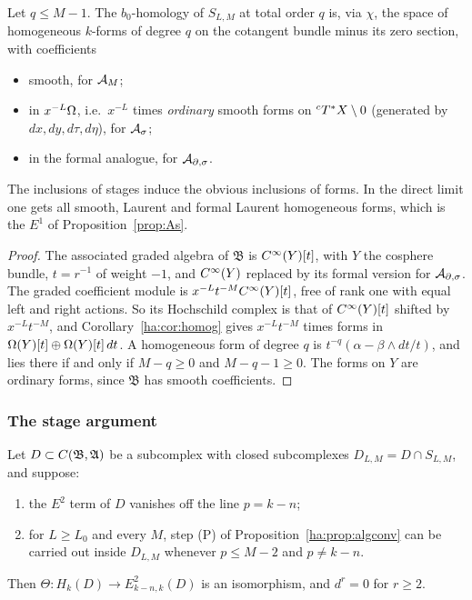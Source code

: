 \begin{lemma}\label{ha:lem:stageE1}
Let \(q\le M-1\). The \(b_0\)-homology of \(S_{L,M}\) at total order \(q\)
is, via \(\chi\), the space of homogeneous \(k\)-forms of degree \(q\) on
the cotangent bundle minus its zero section, with coefficients
\begin{itemize}
\item smooth, for \(\mathcal A_M\);
\item in \(x^{-L}\Omega\), i.e.\ \(x^{-L}\) times \emph{ordinary} smooth forms
on \({}^cT^*X\setminus0\) (generated by \(dx,dy,d\tau,d\eta\)), for \(\mathcal A_\sigma\);
\item in the formal analogue, for \(\mathcal A_{\partial,\sigma}\).
\end{itemize}
The inclusions of stages induce the obvious inclusions of forms. In the
direct limit one gets all smooth, Laurent and formal Laurent homogeneous
forms, which is the \(E^1\) of Proposition~\ref{prop:As}.
\end{lemma}

\begin{proof}
The associated graded algebra of \(\mathfrak B\) is \(C^\infty(Y)[t]\), with
\(Y\) the cosphere bundle, \(t=r^{-1}\) of weight \(-1\), and \(C^\infty(Y)\)
replaced by its formal version for \(\mathcal A_{\partial,\sigma}\). The graded coefficient module
is \(x^{-L}t^{-M}C^\infty(Y)[t]\), free of rank one with equal left and right
actions. So its Hochschild complex is that of \(C^\infty(Y)[t]\) shifted by
\(x^{-L}t^{-M}\), and Corollary~\ref{ha:cor:homog} gives \(x^{-L}t^{-M}\)
times forms in \(\Omega(Y)[t]\oplus\Omega(Y)[t]\,dt\). A homogeneous form of
degree \(q\) is \(t^{-q}(\alpha-\beta\wedge dt/t)\), and lies there if and
only if \(M-q\ge0\) and \(M-q-1\ge0\). The forms on \(Y\) are ordinary
forms, since \(\mathfrak B\) has smooth coefficients.
\end{proof}

\subsubsection*{The stage argument}

\begin{proposition}\label{ha:prop:stage}
Let \(D\subset C(\mathfrak B,\mathfrak A)\) be a subcomplex with closed
subcomplexes \(D_{L,M}=D\cap S_{L,M}\), and suppose:
\begin{enumerate}
\item[(E2)] the \(E^2\) term of \(D\) vanishes off the line \(p=k-n\);
\item[(St)] for \(L\ge L_0\) and every \(M\), step (P) of
Proposition~\ref{ha:prop:algconv} can be carried out inside \(D_{L,M}\)
whenever \(p\le M-2\) and \(p\ne k-n\).
\end{enumerate}
Then \(\Theta:H_k(D)\to E^2_{k-n,k}(D)\) is an isomorphism, and
\(d^r=0\) for \(r\ge2\).
\end{proposition}


